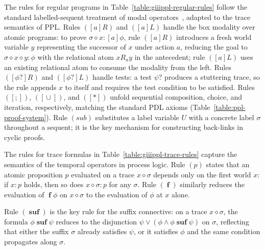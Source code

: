 \documentclass[manuscript,screen]{acmart}
\DeclareMathOperator{\seq}{;}
\DeclareMathOperator{\cho}{\cup}
\newcommand{\Sub}[0]{{\textit{sub}}}
\newcommand{\lup}[0]{*}
\newcommand{\cat}[0]{\diamond}
\DeclareMathOperator{\ofst}{\mathbf{f}}
\DeclareMathOperator{\osuf}{\mathbf{suf}}
\newcommand{\PPL}[0]{\mbox{PPL}}
\begin{document}
The rules for regular programs in Table~\ref{table:giiippl-regular-rules} follow the standard labelled-sequent treatment of modal operators~\cite{Negri05}, adapted to the trace semantics of \PPL.  Rules $([a]R)$ and $([a]L)$ handle the box modality over atomic programs: to prove $\sigma\cat x : [a]\phi$, rule $([a]R)$ introduces a fresh world variable $y$ representing the successor of $x$ under action $a$, reducing the goal to $\sigma\cat x\cat y : \phi$ with the relational atom $xR_a y$ in the antecedent; rule $([a]L)$ uses an existing relational atom to consume the modality from the left.  Rules $([\phi?]R)$ and $([\phi?]L)$ handle tests: a test $\psi?$ produces a stuttering trace, so the rule appends $x$ to itself and requires the test condition to be satisfied.  Rules $([\seq])$, $([\cho])$, and $([\lup])$ unfold sequential composition, choice, and iteration, respectively, matching the standard PDL axioms (Table~\ref{table:ppl-proof-system}).  Rule $(\Sub)$ substitutes a label variable $U$ with a concrete label $\sigma$ throughout a sequent; it is the key mechanism for constructing back-links in cyclic proofs. 



The rules for trace formulas in Table~\ref{table:giiippl-trace-rules} capture the semantics of the temporal operators in process logic.  Rule $(p)$ states that an atomic proposition $p$ evaluated on a trace $x\cat\sigma$ depends only on the first world $x$: if $x : p$ holds, then so does $x\cat\sigma : p$ for any $\sigma$.  Rule $(\ofst)$ similarly reduces the evaluation of $\ofst\phi$ on $x\cat\sigma$ to the evaluation of $\phi$ at $x$ alone.  

\ifx
Rule $(\osuf)$ is the key rule for the suffix connective: on a trace $x\cat\sigma$, the formula $\phi\osuf\psi$ reduces to the disjunction $\psi \vee (\phi\wedge\phi\osuf\psi)$ on $\sigma$, reflecting that either the suffix $\sigma$ already satisfies $\psi$, or it satisfies $\phi$ and the same condition propagates along $\sigma$.  
\fi
\end{document}
